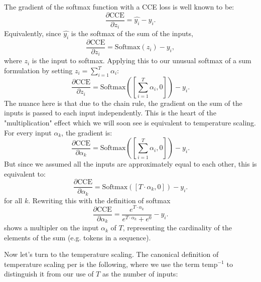 \documentclass[twoside,11pt]{article}
\begin{document}
The gradient of the softmax function with a CCE loss is well known to be:
\[
  \frac{\partial \text{CCE}}{\partial z_i} = \hat{y_i} - y_i.
\] 
Equivalently, since $\hat{y_i}$ is the softmax of the sum of the inputs,
\[
  \frac{\partial \text{CCE}}{\partial z_i} = \text{Softmax}(z_i) - y_i,
\] where $z_i$ is the input to softmax. 
Applying this to our unusual softmax of a sum formulation by setting 
$z_i = \sum_{i=1}^T \alpha_i$:
\[
  \frac{\partial \text{CCE}}{\partial z_i} = \text{Softmax}([\sum_{i=1}^T \alpha_i, 0]) - y_i.
\] The nuance here is that due to the chain rule, the gradient on the 
sum of the inputs is passed to each input independently. This is the heart 
of the "multiplication" effect which we will soon see is equivalent to temperature scaling.
For every input $\alpha_k$, the gradient is:
\[
  \frac{\partial \text{CCE}}{\partial \alpha_k} = \text{Softmax}([\sum_{i=1}^T \alpha_i, 0]) - y_i.
\]
But since we assumed all the inputs are approximately equal to each other,
this is equivalent to:
\[
  \frac{\partial \text{CCE}}{\partial \alpha_k} = \text{Softmax}([T \cdot \alpha_k, 0]) - y_i.
\] for all $k$. Rewriting this with the definition of softmax
\begin{equation}
  \label{eq:softmax-sum}
  \frac{\partial \text{CCE}}{\partial \alpha_k} = \frac{e^{T \cdot \alpha_k}}{e^{T \cdot \alpha_k} + e^0} - y_i.
\end{equation} shows a multipler on the input $\alpha_k$ of $T$, representing the cardinality 
of the elements of the sum (e.g. tokens in a sequence). 

Now let's turn to the temperature scaling. The canonical definition of temperature scaling 
per \cite[Equation~2]{hinton2015distilling} is the following, where we use the term
$\mathrm{temp}^{-1}$ to distinguish it from our use of $T$ as the number
of inputs:
\end{document}
